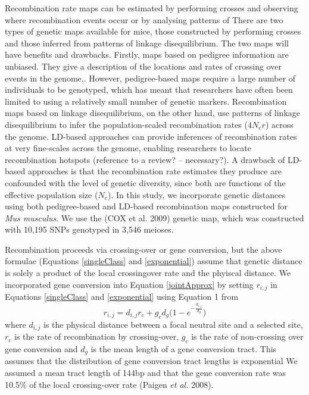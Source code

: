 \documentclass[11pt]{article}
\begin{document}
	Recombination rate maps can be estimated by performing crosses and observing where recombination events occur or by analysing patterns of  
	There are two types of genetic maps available for mice, those constructed by performing crosses and those inferred from patterns of linkage disequilibrium. The two maps will have benefits and drawbacks. Firstly, maps based on pedigree information are unbiased. They give a description of the locations and rates of crossing over events in the genome,. However, pedigree-based maps require a large number of individuals to be genotyped, which has meant that researchers have often been limited to using a relatively small number of genetic markers. Recombination maps based on linkage disequilibrium, on the other hand, use patterns of linkage disequilibrium to infer the population-scaled recombination rates ($4N_er$) across the genome. LD-based approaches can provide inferences of recombination rates at very fine-scales across the genome, enabling researchers to locate recombination hotspots (reference to a review? – necessary?). A drawback of LD-based approaches is that the recombination rate estimates they produce are confounded with the level of genetic diversity, since both are functions of the effective population size ($N_e$). In this study, we incorporate genetic distances using both pedigree-based and LD-based recombination maps constructed for \emph{Mus musculus}. We use the (COX et al. 2009) genetic map, which was constructed with 10,195 SNPs genotyped in 3,546 meioses. 

Recombination proceeds via crossing-over or gene conversion, but the above formulae (Equations \ref{singleClass} and \ref{exponential}) assume that genetic distance is solely a product of the local crossingover rate and the phyiscal distance.  We incorporated gene conversion into Equation \ref{jointApprox} by setting $r_{i,j}$ in Equations \ref{singleClass} and \ref{exponential} using Equation 1 from \cite{RN361}
		\begin{equation}
		\label{geneConversion}
		r_{i,j} = d_{i,j} r_c + g_c d_g \Bigg( 1 - e ^{-\frac{d_{i,j}}{d_g}} \Bigg)
		\end{equation}
	where $d_{i,j}$ is the physical distance between a focal neutral site and a selected site, $r_c$ is the rate of recombination by crossing-over, $g_c$ is the rate of non-crossing over gene conversion and $d_g$ is the mean length of a gene conversion tract. This 
assumes that the distribution of gene conversion tract lengths is exponential	We assumed a mean tract length of 144bp and that the gene conversion rate was 10.5\% of the local crossing-over rate (Paigen \textit{et al.} 2008).
\end{document}
